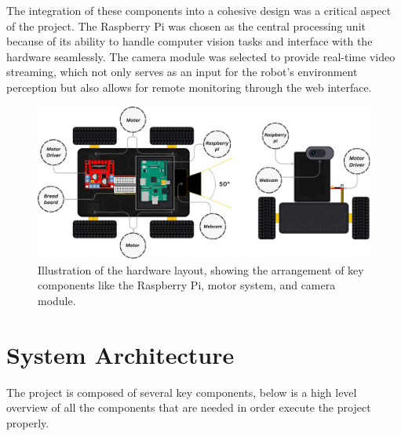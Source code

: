The integration of these components into a cohesive design was a critical aspect of the project. The Raspberry Pi was chosen as the central processing unit because of its ability to handle computer vision tasks and interface with the hardware seamlessly. The camera module was selected to provide real-time video streaming, which not only serves as an input for the robot’s environment perception but also allows for remote monitoring through the web interface.

\begin{figure}[H]
	\centering
	\includegraphics[width=1\textwidth]{ch4/figs/robot_car.png}
	\caption{Illustration of the hardware layout, showing the arrangement of key components like the Raspberry Pi, motor system, and camera module.}
	\label{fig:hardware_layout}
\end{figure}


\section{\label{sec:sys_architecture} System Architecture}

The project is composed of several key components, below is a high level overview of all the components that are needed in order execute the project properly.

